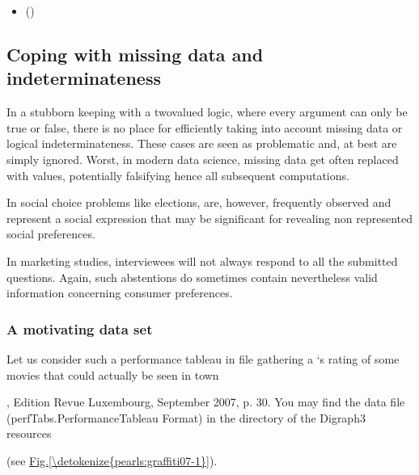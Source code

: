 \documentclass[a4paper,12pt,english]{sphinxhowto}
\begin{document}
\begin{sphinxcontents}
\begin{itemize}
\item {} 
\sphinxAtStartPar
{}\label{\detokenize{pearls:id143}}{\hyperref[\detokenize{pearls:consensus-quality-of-the-bipolar-valued-outranking-relation}]{}} ()

\end{itemize}
\end{sphinxcontents}


\subsection{Coping with missing data and indeterminateness}
\label{\detokenize{pearls:coping-with-missing-data-and-indeterminateness}}\label{\detokenize{pearls:copingmissing-data-label}}
\sphinxAtStartPar
In a stubborn keeping with a two\sphinxhyphen{}valued logic, where every argument can only be true or false, there is no place for efficiently taking into account missing data or logical indeterminateness. These cases are seen as problematic and, at best are simply ignored. Worst, in modern data science, missing data get often replaced with  values, potentially falsifying hence all subsequent computations.

\sphinxAtStartPar
In social choice problems like elections,  are, however, frequently observed and represent a social expression that may be significant for revealing non represented social preferences.

\sphinxAtStartPar
In marketing studies, interviewees will not always respond to all the submitted questions. Again, such abstentions do sometimes contain nevertheless valid information concerning consumer preferences.


\subsubsection{A motivating data set}
\label{\detokenize{pearls:a-motivating-data-set}}
\sphinxAtStartPar
Let us consider such a performance tableau in file  gathering a  ‘s rating of some movies that could actually be seen in town %
\begin{footnote}[1]\sphinxAtStartFootnote
{}, Edition Revue Luxembourg, September 2007, p. 30. You may find the data file  (perfTabs.PerformanceTableau Format) in the  directory of the Digraph3 resources
%
\end{footnote} (see \hyperref[\detokenize{pearls:graffiti07-1}]{Fig.\@ \ref{\detokenize{pearls:graffiti07-1}}}).
\end{document}
